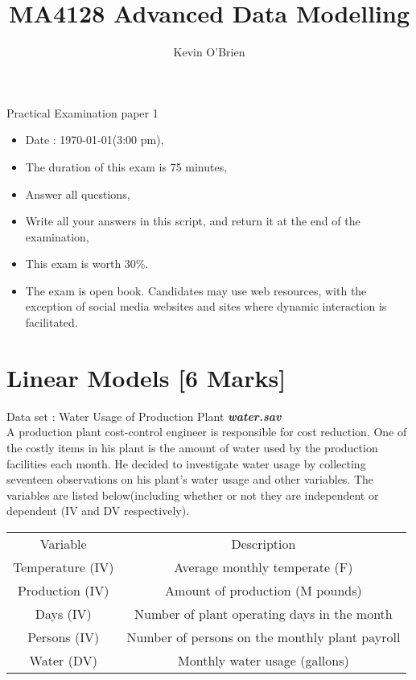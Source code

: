 \documentclass[12pt, a4paper]{article}
\author{ }
\theoremstyle{plain}
\theoremstyle{definition}
\theoremstyle{remark}
\begin{document}
\author{Kevin O'Brien}
\title{MA4128 Advanced Data Modelling}
\maketitle


{\Large
Practical Examination paper 1
}
\begin{itemize}
\item Date : \today     (3:00 pm),
\item The duration of this exam is 75 minutes,
\item Answer all questions,
\item Write all your answers in this script, and return it at the end of the examination,
\item This exam is worth 30\%.
\item The exam is open book. Candidates may use web resources, with the exception of social media websites and sites where dynamic interaction is facilitated.
\end{itemize}
\tableofcontents
\newpage



\newpage
\section{Linear Models [6 Marks] }  %

Data set : Water Usage of Production Plant \textit{\textbf{water.sav}}\\

A production plant cost-control engineer is responsible for cost reduction. One of the costly items in his plant is the amount of water used by the production facilities each month. He decided to investigate water usage by collecting seventeen observations on his plant's water usage and other variables. The variables are listed below(including whether or not they are independent or dependent (IV and DV respectively).
\begin{center}
\begin{tabular}{|c|c|}
  \hline
Variable	&	Description \\
Temperature (IV)	&	Average monthly temperate (F)\\
Production (IV)	&	Amount of production (M pounds)\\
Days	(IV) &	Number of plant operating days in the month\\
Persons	(IV) &	Number of persons on the monthly plant payroll\\
Water (DV)	&	Monthly water usage (gallons)\\
  \hline
\end{tabular}
\end{center}
\newpage
\end{document}

